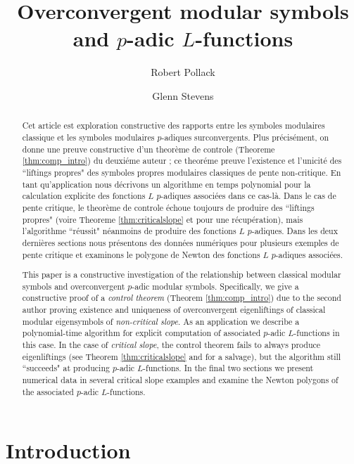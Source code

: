 \documentclass{amsart}
\title[Overconvergent modular symbols]{Overconvergent modular symbols and $p$-adic $L$-functions}
\author{Robert Pollack}
\author{Glenn Stevens}
\theoremstyle{plain}
\theoremstyle{definition}
\begin{document}
\maketitle


\begin{abstract}
 Cet article est exploration constructive des rapports entre les
 symboles modulaires classique et les symboles modulaires $p$-adiques
 surconvergents. Plus pr\'ecis\'ement, on donne une preuve constructive
 d'un theor\`eme de controle (Theoreme \ref{thm:comp_intro}) du deuxi\'eme auteur \cite{Stevens}; ce theor\'eme preuve l'existence et l'unicit\'e des ``liftings propres" des
 symboles propres modulaires classiques de pente non-critique. En tant
 qu'application nous d\'ecrivons un algorithme en temps polynomial pour
 la calculation explicite des fonctions $L$ $p$-adiques associ\'ees dans ce
 cas-l\`a. Dans le cas de pente critique, le theor\`eme de controle \'echoue
 toujours de produire des ``liftings propres" (voire Theoreme  \ref{thm:criticalslope} 
 et \cite{PS} pour une r\'ecup\'eration), mais l'algorithme ``r\'eussit" n\'eanmoins de
 produire des fonctions $L$ $p$-adiques. Dans les deux derni\`eres sections
 nous pr\'esentons des donn\'ees num\'eriques pour plusieurs exemples de
 pente critique et examinons le polygone de Newton des fonctions $L$
 $p$-adiques associ\'ees.
\end{abstract}


\begin{abstract}
This paper is a constructive investigation of the relationship between classical modular symbols and overconvergent $p$-adic 
modular symbols.  Specifically, we give a constructive proof of a {\it control theorem} (Theorem \ref{thm:comp_intro}) due to the second author \cite{Stevens} proving existence and uniqueness of overconvergent eigenliftings of classical modular eigensymbols of {\it non-critical slope}.  As an application we
describe a polynomial-time algorithm for explicit computation of associated $p$-adic $L$-functions in this case.   In the case of {\it critical slope}, the control theorem fails to always produce eigenliftings (see Theorem \ref{thm:criticalslope} and \cite{PS} for a salvage), but the algorithm still ``succeeds" at producing $p$-adic $L$-functions.   In the final two sections we present numerical data in several critical slope examples and examine the Newton polygons of the associated $p$-adic $L$-functions. 
\end{abstract}


\section{Introduction}
\end{document}
